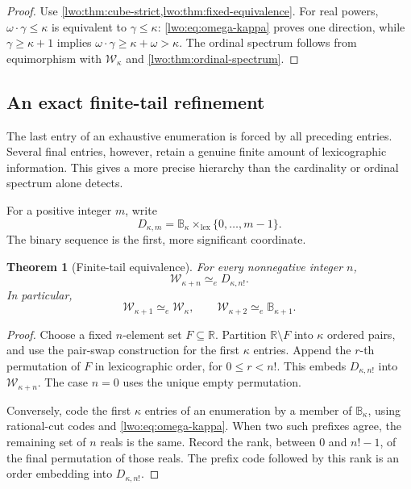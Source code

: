 \documentclass[11pt,a4paper]{article}
\newtheorem{theorem}{Theorem}[section]
\newtheorem{corollary}[theorem]{Corollary}
\theoremstyle{definition}
\theoremstyle{remark}
\newcommand{\R}{\mathbb R}
\newcommand{\W}{\mathcal W}
\newcommand{\A}{\mathcal A}
\newcommand{\B}{\mathbb B}
\newcommand{\lex}{\mathrm{lex}}
\newcommand{\emb}{\hookrightarrow}
\newcommand{\equi}{\mathrel{\simeq_{\!e}}}
\begin{document}
\begin{proof}
Use \cref{lwo:thm:cube-strict,lwo:thm:fixed-equivalence}. For real powers,
$\omega\cdot\gamma\leq\kappa$ is equivalent to $\gamma\leq\kappa$:
\eqref{lwo:eq:omega-kappa} proves one direction, while
$\gamma\geq\kappa+1$ implies
$\omega\cdot\gamma\geq\kappa+\omega>\kappa$. The ordinal spectrum follows
from equimorphism with $\W_\kappa$ and \cref{lwo:thm:ordinal-spectrum}.
\end{proof}

\subsection{An exact finite-tail refinement}
The last entry of an exhaustive enumeration is forced by all preceding
entries. Several final entries, however, retain a genuine finite amount of
lexicographic information. This gives a more precise hierarchy than the
cardinality or ordinal spectrum alone detects.

For a positive integer $m$, write
\[
                  D_{\kappa,m}=\B_\kappa\times_{\lex}\{0,\ldots,m-1\}.
\]
The binary sequence is the first, more significant coordinate.

\begin{theorem}[Finite-tail equivalence]\label{lwo:thm:finite-tail}
For every nonnegative integer $n$,
\begin{equation}\label{lwo:eq:finite-tail}
                         \W_{\kappa+n}\equi D_{\kappa,n!}.
\end{equation}
In particular,
\[
 \W_{\kappa+1}\equi\W_\kappa,
 \qquad
 \W_{\kappa+2}\equi\B_{\kappa+1}.
\]
\end{theorem}
\begin{proof}
Choose a fixed $n$-element set $F\subseteq\R$. Partition $\R\setminus F$
into $\kappa$ ordered pairs, and use the pair-swap construction for the
first $\kappa$ entries. Append the $r$-th permutation of $F$ in lexicographic
order, for $0\leq r<n!$. This embeds $D_{\kappa,n!}$ into
$\W_{\kappa+n}$. The case $n=0$ uses the unique empty permutation.

Conversely, code the first $\kappa$ entries of an enumeration by a member of
$\B_\kappa$, using rational-cut codes and \eqref{lwo:eq:omega-kappa}. When two
such prefixes agree, the remaining set of $n$ reals is the same. Record the
rank, between $0$ and $n!-1$, of the final permutation of those reals. The
prefix code followed by this rank is an order embedding into
$D_{\kappa,n!}$.
\end{proof}
\end{document}
